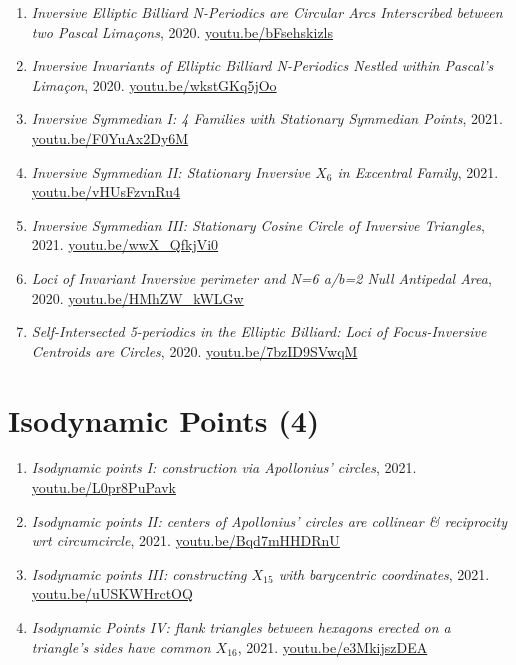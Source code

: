 \documentclass[12pt]{article}
\begin{document}
\begin{enumerate}[resume]
\item \textit{Inversive Elliptic Billiard N-Periodics are Circular Arcs Interscribed between two Pascal Limaçons}, 2020. \href{https://youtu.be/bFsehskizls}{\url{youtu.be/bFsehskizls}}
\item \textit{Inversive Invariants of Elliptic Billiard N-Periodics Nestled within Pascal's Limaçon}, 2020. \href{https://youtu.be/wkstGKq5jOo}{\url{youtu.be/wkstGKq5jOo}}
\item \textit{Inversive Symmedian I: 4 Families with Stationary Symmedian Points}, 2021. \href{https://youtu.be/F0YuAx2Dy6M}{\url{youtu.be/F0YuAx2Dy6M}}
\item \textit{Inversive Symmedian II: Stationary Inversive $X_{6}$ in Excentral Family}, 2021. \href{https://youtu.be/vHUsFzvnRu4}{\url{youtu.be/vHUsFzvnRu4}}
\item \textit{Inversive Symmedian III: Stationary Cosine Circle of Inversive Triangles}, 2021. \href{https://youtu.be/wwX_QfkjVi0}{\url{youtu.be/wwX\_QfkjVi0}}
\item \textit{Loci of Invariant Inversive perimeter and N=6 a/b=2 Null Antipedal Area}, 2020. \href{https://youtu.be/HMhZW_kWLGw}{\url{youtu.be/HMhZW\_kWLGw}}
\item \textit{Self-Intersected 5-periodics in the Elliptic Billiard: Loci of Focus-Inversive Centroids are Circles}, 2020. \href{https://youtu.be/7bzID9SVwqM}{\url{youtu.be/7bzID9SVwqM}}
\end{enumerate}

\section{Isodynamic Points (4)}

\begin{enumerate}[resume]
\item \textit{Isodynamic points I: construction via Apollonius' circles}, 2021. \href{https://youtu.be/L0pr8PuPavk}{\url{youtu.be/L0pr8PuPavk}}
\item \textit{Isodynamic points II: centers of Apollonius' circles are collinear \& reciprocity wrt circumcircle}, 2021. \href{https://youtu.be/Bqd7mHHDRnU}{\url{youtu.be/Bqd7mHHDRnU}}
\item \textit{Isodynamic points III: constructing $X_{15}$ with barycentric coordinates}, 2021. \href{https://youtu.be/uUSKWHrctOQ}{\url{youtu.be/uUSKWHrctOQ}}
\item \textit{Isodynamic Points IV: flank triangles between hexagons erected on a triangle's sides have common $X_{16}$}, 2021. \href{https://youtu.be/e3MkijszDEA}{\url{youtu.be/e3MkijszDEA}}
\end{enumerate}
\end{document}
